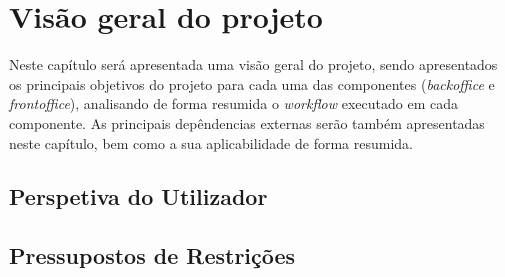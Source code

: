 \chapter{Visão geral do projeto}

Neste capítulo será apresentada uma visão geral do projeto, sendo apresentados os principais objetivos do projeto para cada uma das componentes (\textit{backoffice} e \textit{frontoffice}), analisando de forma resumida o \textit{workflow} executado em cada componente. As principais depêndencias externas serão também apresentadas neste capítulo, bem como a sua aplicabilidade de forma resumida.



\section{Perspetiva do Utilizador}

\section{Pressupostos de Restrições}

